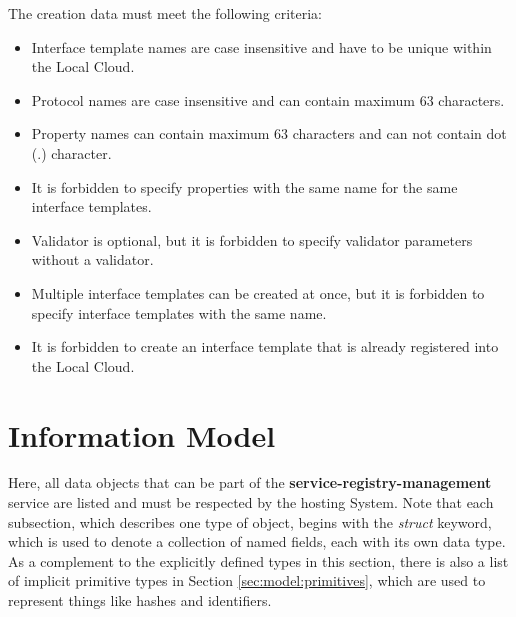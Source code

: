\documentclass[a4paper]{arrowhead}
\begin{document}
The creation data must meet the following criteria:

\begin{itemize}
    \item Interface template names are case insensitive and have to be unique within the Local Cloud.
    \item Protocol names are case insensitive and can contain maximum 63 characters.
    \item Property names can contain maximum 63 characters and can not contain dot (.) character.
    \item It is forbidden to specify properties with the same name for the same interface templates.
    \item Validator is optional, but it is forbidden to specify validator parameters without a validator.
    \item Multiple interface templates can be created at once, but it is forbidden to specify interface templates with the same name.
    \item It is forbidden to create an interface template that is already registered into the Local Cloud.
\end{itemize}


\clearpage

\section{Information Model}
\label{sec:model}

Here, all data objects that can be part of the \textbf{service-registry-management} service
are listed and must be respected by the hosting System.
Note that each subsection, which describes one type of object, begins with the \textit{struct} keyword, which is used to denote a collection of named fields, each with its own data type.
As a complement to the explicitly defined types in this section, there is also a list of implicit primitive types in Section \ref{sec:model:primitives}, which are used to represent things like hashes and identifiers.

{}
\end{document}
